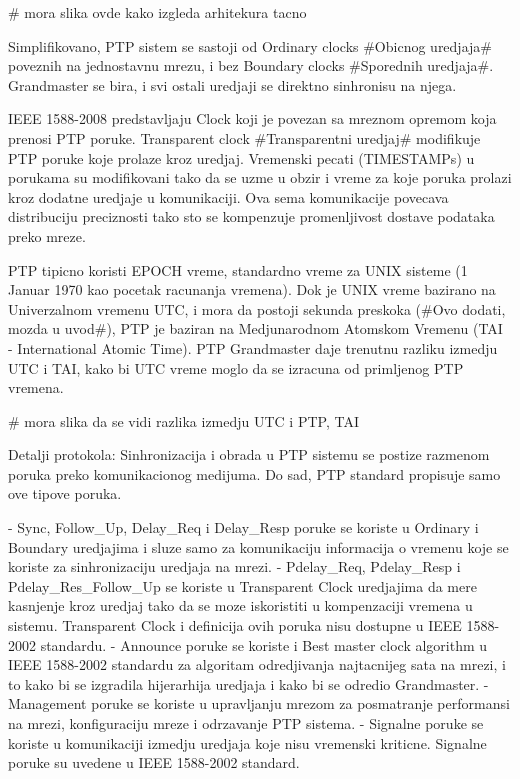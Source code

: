 \documentclass[a4paper,12pt, master]{etf}
\begin{document}
	\# mora slika ovde kako izgleda arhitekura tacno

	Simplifikovano, PTP sistem se sastoji od Ordinary clocks \#Obicnog uredjaja\# poveznih na
	jednostavnu mrezu, i bez Boundary clocks \#Sporednih uredjaja\#. Grandmaster se bira, i svi
	ostali uredjaji se direktno sinhronisu na njega.

	IEEE 1588-2008 predstavljaju Clock koji je povezan sa mreznom opremom koja prenosi PTP poruke.
	Transparent clock \#Transparentni uredjaj\# modifikuje PTP poruke koje prolaze kroz uredjaj.
	Vremenski pecati (TIMESTAMPs) u porukama su modifikovani tako da se uzme u obzir i vreme za
	koje poruka prolazi kroz dodatne uredjaje u komunikaciji. Ova sema komunikacije povecava
	distribuciju preciznosti tako sto se kompenzuje promenljivost dostave podataka preko mreze.

	PTP tipicno koristi EPOCH vreme, standardno vreme za UNIX sisteme (1 Januar 1970 kao pocetak
	racunanja vremena). Dok je UNIX vreme bazirano na Univerzalnom vremenu UTC, i mora da postoji
	sekunda preskoka (\#Ovo dodati, mozda u uvod\#), PTP je baziran na Medjunarodnom Atomskom Vremenu
	(TAI - International Atomic Time). PTP Grandmaster daje trenutnu razliku izmedju UTC i TAI,
	kako bi UTC vreme moglo da se izracuna od primljenog PTP vremena.

	\# mora slika da se vidi razlika izmedju UTC i PTP, TAI

	Detalji protokola:
	Sinhronizacija i obrada u PTP sistemu se postize razmenom poruka preko komunikacionog medijuma.
	Do sad, PTP standard propisuje samo ove tipove poruka.

	- Sync, Follow\_Up, Delay\_Req i Delay\_Resp poruke se koriste u Ordinary i Boundary uredjajima i
	sluze samo za komunikaciju informacija o vremenu koje se koriste za sinhronizaciju uredjaja na
	mrezi.
	- Pdelay\_Req, Pdelay\_Resp i Pdelay\_Res\_Follow\_Up se koriste u Transparent Clock uredjajima da
	mere kasnjenje kroz uredjaj tako da se moze iskoristiti u kompenzaciji vremena u sistemu.
	Transparent Clock i definicija ovih poruka nisu dostupne u IEEE 1588-2002 standardu.
	- Announce poruke se koriste i Best master clock algorithm u IEEE 1588-2002 standardu za
	algoritam odredjivanja najtacnijeg sata na mrezi, i to kako bi se izgradila hijerarhija
	uredjaja i kako bi se odredio Grandmaster.
	- Management poruke se koriste u upravljanju mrezom za posmatranje performansi na mrezi,
	konfiguraciju mreze i odrzavanje PTP sistema.
	- Signalne poruke se koriste u komunikaciji izmedju uredjaja koje nisu vremenski kriticne.
	Signalne poruke su uvedene u IEEE 1588-2002 standard.
\end{document}
